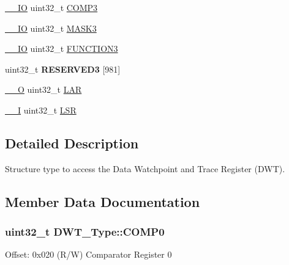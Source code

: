 \begin{DoxyCompactItemize}
\item 
\hyperlink{core__sc300_8h_aec43007d9998a0a0e01faede4133d6be}{\+\_\+\+\_\+\+IO} uint32\+\_\+t \hyperlink{structDWT__Type_a3df15697eec279dbbb4b4e9d9ae8b62f}{C\+O\+M\+P3}
\item 
\hyperlink{core__sc300_8h_aec43007d9998a0a0e01faede4133d6be}{\+\_\+\+\_\+\+IO} uint32\+\_\+t \hyperlink{structDWT__Type_ae3f01137a8d28c905ddefe7333547fba}{M\+A\+S\+K3}
\item 
\hyperlink{core__sc300_8h_aec43007d9998a0a0e01faede4133d6be}{\+\_\+\+\_\+\+IO} uint32\+\_\+t \hyperlink{structDWT__Type_a80bd242fc05ca80f9db681ce4d82e890}{F\+U\+N\+C\+T\+I\+O\+N3}
\item 
uint32\+\_\+t {\bfseries R\+E\+S\+E\+R\+V\+E\+D3} \mbox{[}981\mbox{]}\hypertarget{structDWT__Type_a5c0257af31b22a3e448446ac888d3a73}{}\label{structDWT__Type_a5c0257af31b22a3e448446ac888d3a73}

\item 
\hyperlink{core__sc300_8h_a7e25d9380f9ef903923964322e71f2f6}{\+\_\+\+\_\+O} uint32\+\_\+t \hyperlink{structDWT__Type_a0e69531f29f71c62cccac82417cda0f8}{L\+AR}
\item 
\hyperlink{core__sc300_8h_af63697ed9952cc71e1225efe205f6cd3}{\+\_\+\+\_\+I} uint32\+\_\+t \hyperlink{structDWT__Type_a28449e73e4c03e372c9ee0bb1211a58a}{L\+SR}
\end{DoxyCompactItemize}


\subsection{Detailed Description}
Structure type to access the Data Watchpoint and Trace Register (D\+WT). 

\subsection{Member Data Documentation}
\subsubsection[{\texorpdfstring{C\+O\+M\+P0}{COMP0}}]{ uint32\+\_\+t D\+W\+T\+\_\+\+Type\+::\+C\+O\+M\+P0}\hypertarget{structDWT__Type_a7cf71ff4b30a8362690fddd520763904}{}\label{structDWT__Type_a7cf71ff4b30a8362690fddd520763904}
Offset\+: 0x020 (R/W) Comparator Register 0 
